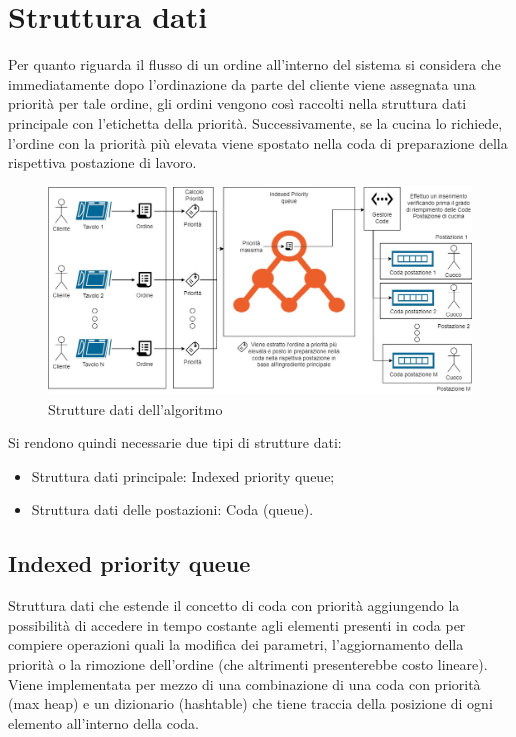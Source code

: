 \section{Struttura dati}
Per quanto riguarda il flusso di un ordine all’interno del sistema si considera che immediatamente dopo l’ordinazione da parte del cliente viene assegnata una priorità per tale ordine, gli ordini vengono così raccolti nella struttura dati principale con l’etichetta della priorità. Successivamente, se la cucina lo richiede, l'ordine con la priorità più elevata viene spostato nella coda di preparazione della rispettiva postazione di lavoro.


\begin{figure}[htbp]
	\centering
	\includegraphics[scale=0.4]{iterazione2/images/Algoritmo_struttura.jpg}
	\caption{Strutture dati dell'algoritmo\label{fig:algoritmo_struttura}}
\end{figure}

Si rendono quindi necessarie due tipi di strutture dati:
\begin{itemize}
	\item Struttura dati principale: Indexed priority queue;
	\item Struttura dati delle postazioni: Coda (queue).
\end{itemize}

\subsection{Indexed priority queue}
Struttura dati che estende il concetto di coda con priorità aggiungendo la possibilità di accedere in tempo costante agli elementi presenti in coda per compiere operazioni quali la modifica dei parametri, l’aggiornamento della priorità o la rimozione dell’ordine (che altrimenti presenterebbe costo lineare).
Viene implementata per mezzo di una combinazione di una coda con priorità (max heap) e un dizionario (hashtable) che tiene traccia della posizione di ogni elemento all'interno della coda.

